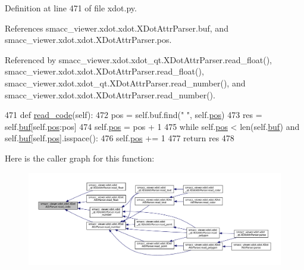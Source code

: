 Definition at line 471 of file xdot.\+py.



References smacc\+\_\+viewer.\+xdot.\+xdot.\+X\+Dot\+Attr\+Parser.\+buf, and smacc\+\_\+viewer.\+xdot.\+xdot.\+X\+Dot\+Attr\+Parser.\+pos.



Referenced by smacc\+\_\+viewer.\+xdot.\+xdot\+\_\+qt.\+X\+Dot\+Attr\+Parser.\+read\+\_\+float(), smacc\+\_\+viewer.\+xdot.\+xdot.\+X\+Dot\+Attr\+Parser.\+read\+\_\+float(), smacc\+\_\+viewer.\+xdot.\+xdot\+\_\+qt.\+X\+Dot\+Attr\+Parser.\+read\+\_\+number(), and smacc\+\_\+viewer.\+xdot.\+xdot.\+X\+Dot\+Attr\+Parser.\+read\+\_\+number().


\begin{DoxyCode}
471     \textcolor{keyword}{def }\hyperlink{classsmacc__viewer_1_1xdot_1_1xdot_1_1XDotAttrParser_a81a7b9dbeee376b4c1043bf3aac31c0c}{read\_code}(self):
472         pos = self.buf.find(\textcolor{stringliteral}{" "}, self.\hyperlink{classsmacc__viewer_1_1xdot_1_1xdot_1_1XDotAttrParser_a4e3d002256eadbd59bda22fc62660cf6}{pos})
473         res = self.\hyperlink{classsmacc__viewer_1_1xdot_1_1xdot_1_1XDotAttrParser_a40fb437711b231cb2d0fed77106edc2f}{buf}[self.\hyperlink{classsmacc__viewer_1_1xdot_1_1xdot_1_1XDotAttrParser_a4e3d002256eadbd59bda22fc62660cf6}{pos}:pos]
474         self.\hyperlink{classsmacc__viewer_1_1xdot_1_1xdot_1_1XDotAttrParser_a4e3d002256eadbd59bda22fc62660cf6}{pos} = pos + 1
475         \textcolor{keywordflow}{while} self.\hyperlink{classsmacc__viewer_1_1xdot_1_1xdot_1_1XDotAttrParser_a4e3d002256eadbd59bda22fc62660cf6}{pos} < len(self.\hyperlink{classsmacc__viewer_1_1xdot_1_1xdot_1_1XDotAttrParser_a40fb437711b231cb2d0fed77106edc2f}{buf}) \textcolor{keywordflow}{and} self.\hyperlink{classsmacc__viewer_1_1xdot_1_1xdot_1_1XDotAttrParser_a40fb437711b231cb2d0fed77106edc2f}{buf}[self.\hyperlink{classsmacc__viewer_1_1xdot_1_1xdot_1_1XDotAttrParser_a4e3d002256eadbd59bda22fc62660cf6}{pos}].isspace():
476             self.\hyperlink{classsmacc__viewer_1_1xdot_1_1xdot_1_1XDotAttrParser_a4e3d002256eadbd59bda22fc62660cf6}{pos} += 1
477         \textcolor{keywordflow}{return} res
478 
\end{DoxyCode}


Here is the caller graph for this function\+:
\nopagebreak
\begin{figure}[H]
\begin{center}
\leavevmode
\includegraphics[width=350pt]{classsmacc__viewer_1_1xdot_1_1xdot_1_1XDotAttrParser_a81a7b9dbeee376b4c1043bf3aac31c0c_icgraph}
\end{center}
\end{figure}


